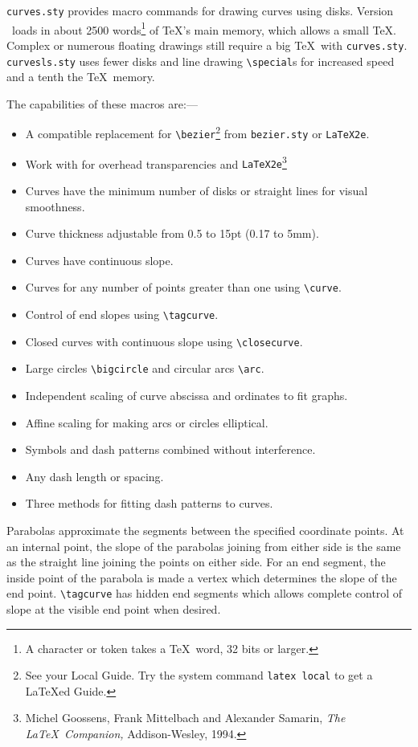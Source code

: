   {\tt curves.sty} provides macro commands for drawing curves using disks.
Version \version\ loads in about 2500 words\footnote{A character or token
takes a \TeX\ word, 32 bits or larger.} of \TeX's main memory, which allows a
small \TeX. Complex or numerous floating drawings still require a big \TeX\
with {\tt curves.sty}. {\tt curvesls.sty} uses fewer disks and line drawing
\verb?\special?s for increased speed and a tenth the \TeX\ memory.

  The capabilities of these macros are:---
    \begin{itemize}
  \item A compatible replacement for \verb?\bezier?\footnote{See your Local
Guide. Try the system command {\tt latex local} to get a \LaTeX ed Guide.} 
from {\tt bezier.sty} or {\tt LaTeX2e}. 
  \item Work with {\makeatletter {}}
for overhead transparencies and {\tt LaTeX2e}\footnote{Michel Goossens, Frank
Mittelbach and Alexander Samarin, {\sl The \LaTeX\ Companion,} Addison-Wesley,
1994.} 
  \item Curves have the minimum number of disks or straight lines for visual
smoothness.
  \item Curve thickness adjustable from 0.5 to 15pt (0.17 to 5mm).
  \item Curves have continuous slope.
  \item Curves for any number of points greater than one using \verb?\curve?.
  \item Control of end slopes using \verb?\tagcurve?.
  \item Closed curves with continuous slope using \verb?\closecurve?.
  \item Large circles \verb?\bigcircle? and circular arcs \verb?\arc?.
  \item Independent scaling of curve abscissa and ordinates to fit graphs.
  \item Affine scaling for making arcs or circles elliptical.
  \item Symbols and dash patterns combined without interference.
  \item Any dash length or spacing.
  \item Three methods for fitting dash patterns to curves.
    \end{itemize}

  Parabolas approximate the segments between the specified coordinate points.  
At an internal point, the slope of the parabolas joining from either side is 
the same as the straight line joining the points on either side. For an end 
segment, the inside point of the parabola is made a vertex which determines 
the slope of the end point. \verb?\tagcurve? has hidden end segments which 
allows complete control of slope at the visible end point when desired. 
  
